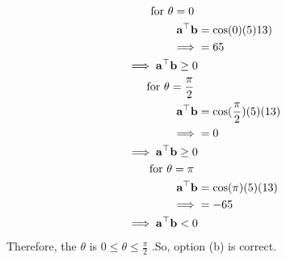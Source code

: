 \documentclass[10pt]{article}
\let\vec\mathbf{}
\begin{document}
\begin{enumerate}
\begin{align}
\text{ for $\theta=0$ }\notag \\
{\vec{a}}^{\top}{\vec{b}}&=\cos(0)(5)13)\\
\implies &=65\\
\implies {\vec{a}}^{\top}{\vec{b}}\ge0 \notag \\
\text{ for $\theta=\frac{\pi}{2}$ }\notag \\
{\vec{a}}^{\top}{\vec{b}}&=\cos(\frac{\pi}{2})(5)(13) \\
\implies &=0\\
\implies {\vec{a}}^{\top}{\vec{b}}\ge0 \notag\\
\text{ for $\theta=\pi$ }\notag \\
{\vec{a}}^{\top}{\vec{b}}&=\cos(\pi)(5)(13)\\
\implies &=-65\\
\implies {\vec{a}}^{\top}{\vec{b}}<0 \notag
\end{align}
Therefore, the $\theta$ is $0\le\theta\le\frac{\pi}{2}$ .So, option (b) is correct.
\end{enumerate}
\end{document}
